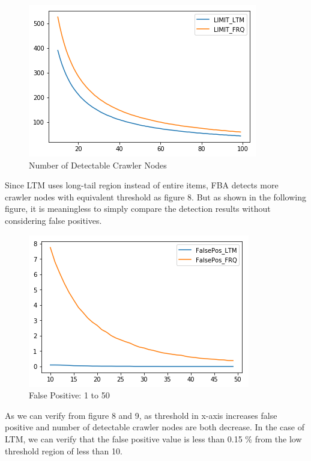 \documentclass[sigconf,anonymous=true]{acmart}
\begin{document}
\begin{figure}[H]
    \centering
    \includegraphics[width=0.85\columnwidth]{figs/figure_limit_compare.png}
    \caption{Number of Detectable Crawler Nodes}
    \label{fig:my_label}
\end{figure}

Since LTM uses long-tail region instead of entire items, FBA detects more crawler nodes with equivalent threshold as figure 8. But as shown in the following figure, it is meaningless to simply compare the detection results without considering false positives.

\begin{figure}[H]
    \centering
    \includegraphics[width=0.85\columnwidth]{figs/figure_fp_compare_01.png}
    \caption{False Positive: 1 to 50}
    \label{fig:my_label}
\end{figure}

As we can verify from figure 8 and 9, as threshold in x-axis increases false positive and number of detectable crawler nodes are both decrease. In the case of LTM, we can verify that the false positive value is less than 0.15 \% from the low threshold region of less than 10.
\end{document}
